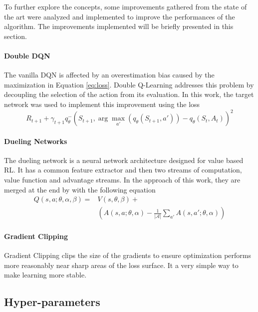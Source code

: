 \documentclass[letterpaper]{article}
\begin{document}
To further explore the concepts, some improvements gathered from the state of the art were analyzed and implemented to improve the performances of the algorithm. The improvements implemented will be briefly presented in this section.

\paragraph{Double DQN}
The vanilla DQN is affected by an overestimation bias caused by the maximization in Equation \ref{eq:loss}. Double Q-Learning \cite{hasselt2010double} addresses this problem by decoupling the selection of the action from its evaluation. In this work, the target network was used to implement this improvement using the loss
\begin{equation*}
    R_{t+1} + \gamma_{t+1} q_\theta^-(S_{t+1}, \arg\max_{a'}(q_\theta(S_{t+1}, a')) -q_\theta(S_t,A_t))^2
    \label{eq:doubleloss}
\end{equation*}

\paragraph{Dueling Networks}

The dueling network \cite{wang2016dueling} is a neural network architecture designed for value based RL. It has a common feature extractor and then two streams of computation, value function and advantage streams. In the approach of this work, they are merged at the end by with the following equation
\begin{equation*}
    \begin{aligned}
    Q(s,a;\theta,\alpha,\beta) = {} & V(s,\theta,\beta){} + \\&(A(s,a;\theta,\alpha) - \frac{1}{|\mathcal{A}|}\sum_{a'}A(s,a';\theta,\alpha))
    \end{aligned}
\end{equation*}

\paragraph{Gradient Clipping}

Gradient Clipping \cite{goodfellow2016deep} clips the size of the gradients to ensure optimization performs more reasonably near sharp areas of the loss surface. It a very simple way to make learning more stable.

\subsection{Hyper-parameters}
\end{document}
